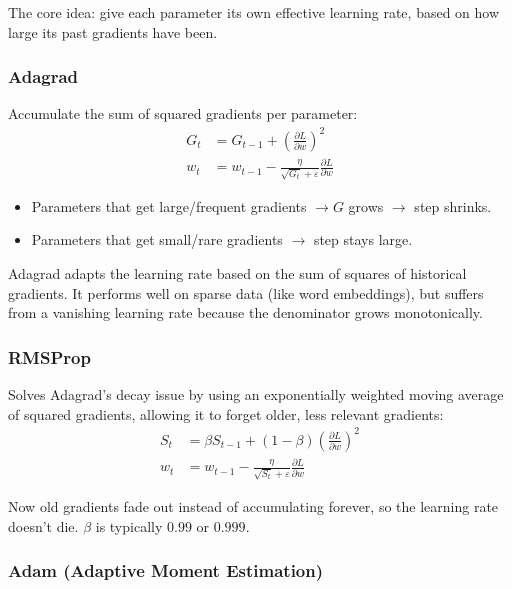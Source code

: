 The core idea: give each parameter its own effective learning rate, based on how large its past gradients have been.

\subsubsection{Adagrad}

Accumulate the sum of squared gradients per parameter:
\begin{align}
G_t &= G_{t-1} + \left( \frac{\partial L}{\partial w} \right)^2 \\
w_t &= w_{t-1} - \frac{\eta}{\sqrt{G_t} + \varepsilon} \frac{\partial L}{\partial w}
\end{align}

\begin{itemize}
    \item Parameters that get large/frequent gradients $\to G$ grows $\to$ step shrinks.
    \item Parameters that get small/rare gradients $\to$ step stays large.
\end{itemize}

Adagrad adapts the learning rate based on the sum of squares of historical gradients. It performs well on sparse data (like word embeddings), but suffers from a vanishing learning rate because the denominator grows monotonically.

\subsubsection{RMSProp}

Solves Adagrad's decay issue by using an exponentially weighted moving average of squared gradients, allowing it to forget older, less relevant gradients:
\begin{align}
S_t &= \beta S_{t-1} + (1 - \beta) \left( \frac{\partial L}{\partial w} \right)^2 \\
w_t &= w_{t-1} - \frac{\eta}{\sqrt{S_t} + \varepsilon} \frac{\partial L}{\partial w}
\end{align}

Now old gradients fade out instead of accumulating forever, so the learning rate doesn't die. $\beta$ is typically $0.99$ or $0.999$.

\subsubsection{Adam (Adaptive Moment Estimation)}

